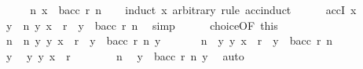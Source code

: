 \begin{isabellebody}
\ \ \isamarkupfalse%
\ \isamarkupfalse%
\ {\isachardoublequoteopen}{\isasymexists}n{\isachardot}{\kern0pt}\ x\ {\isasymin}\ bacc\ r\ n{\isachardoublequoteclose}\isanewline
\ \ \isamarkupfalse%
\ {\isacharparenleft}{\kern0pt}induct\ x\ arbitrary{\isacharcolon}{\kern0pt}\ rule{\isacharcolon}{\kern0pt}\ acc{\isachardot}{\kern0pt}induct{\isacharparenright}{\kern0pt}\isanewline
\ \ \ \ \isamarkupfalse%
\ {\isacharparenleft}{\kern0pt}accI\ x{\isacharparenright}{\kern0pt}\isanewline
\ \ \ \ \isamarkupfalse%
\ \isamarkupfalse%
\ {\isachardoublequoteopen}{\isasymforall}y{\isachardot}{\kern0pt}\ {\isasymexists}\ n{\isachardot}{\kern0pt}\ {\isacharparenleft}{\kern0pt}y{\isacharcomma}{\kern0pt}\ x{\isacharparenright}{\kern0pt}\ {\isasymin}\ r\ {\isasymlongrightarrow}\ y\ {\isasymin}\ bacc\ r\ n{\isachardoublequoteclose}\ \isamarkupfalse%
\ simp\isanewline
\ \ \ \ \isamarkupfalse%
\ choice{\isacharbrackleft}{\kern0pt}OF\ this{\isacharbrackright}{\kern0pt}\ \isamarkupfalse%
\ n\ \ n{\isacharcolon}{\kern0pt}\ {\isachardoublequoteopen}{\isasymforall}y{\isachardot}{\kern0pt}\ {\isacharparenleft}{\kern0pt}y{\isacharcomma}{\kern0pt}\ x{\isacharparenright}{\kern0pt}\ {\isasymin}\ r\ {\isasymlongrightarrow}\ y\ {\isasymin}\ bacc\ r\ {\isacharparenleft}{\kern0pt}n\ y{\isacharparenright}{\kern0pt}{\isachardoublequoteclose}\ \isacommand{{\isachardot}{\kern0pt}{\isachardot}{\kern0pt}}\isamarkupfalse%
\isanewline
\ \ \ \ \isamarkupfalse%
\ n\ \ {\isachardoublequoteopen}{\isasymAnd}y{\isachardot}{\kern0pt}\ {\isacharparenleft}{\kern0pt}y{\isacharcomma}{\kern0pt}\ x{\isacharparenright}{\kern0pt}\ {\isasymin}\ r\ {\isasymLongrightarrow}\ y\ {\isasymin}\ bacc\ r\ n{\isachardoublequoteclose}\isanewline
\ \ \ \ \isamarkupfalse%
\isanewline
\ \ \ \ \ \ \isamarkupfalse%
\ y\ \isamarkupfalse%
\ y{\isacharcolon}{\kern0pt}\ {\isachardoublequoteopen}{\isacharparenleft}{\kern0pt}y{\isacharcomma}{\kern0pt}\ x{\isacharparenright}{\kern0pt}\ {\isasymin}\ r{\isachardoublequoteclose}\isanewline
\ \ \ \ \ \ \isamarkupfalse%
\ n\ \isamarkupfalse%
\ {\isachardoublequoteopen}y\ {\isasymin}\ bacc\ r\ {\isacharparenleft}{\kern0pt}n\ y{\isacharparenright}{\kern0pt}{\isachardoublequoteclose}\ \isamarkupfalse%
\ auto\isanewline
\ \ \ \ \ \ \isamarkupfalse%
\ \isamarkupfalse%

\end{isabellebody}
